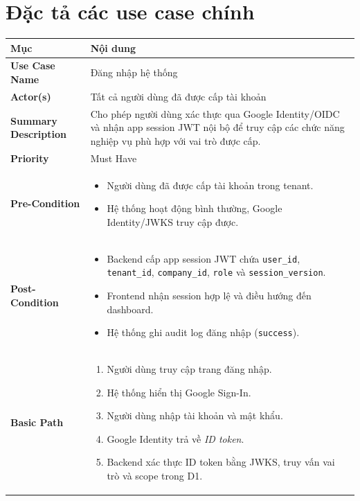 \section{Đặc tả các use case chính}
\label{sec:usecase_spec}

\begin{xltabular}{\textwidth}{|>{\bfseries}p{4.5cm}|X|}
    \hline
    \textbf{Mục} & \textbf{Nội dung} \\
    \hline
    Use Case Name & Đăng nhập hệ thống \\
    \hline
    Actor(s) & Tất cả người dùng đã được cấp tài khoản \\
    \hline
    Summary Description & Cho phép người dùng xác thực qua Google Identity/OIDC và nhận app session JWT nội bộ để truy cập các chức năng nghiệp vụ phù hợp với vai trò được cấp. \\
    \hline
    Priority & Must Have \\
    \hline
    Pre-Condition &
    \begin{itemize}[leftmargin=*, nosep]
        \item Người dùng đã được cấp tài khoản trong tenant.
        \item Hệ thống hoạt động bình thường, Google Identity/JWKS truy cập được.
    \end{itemize} \\
    \hline
    Post-Condition &
    \begin{itemize}[leftmargin=*, nosep]
        \item Backend cấp app session JWT chứa \texttt{user\_id}, \texttt{tenant\_id}, \texttt{company\_id}, \texttt{role} và \texttt{session\_version}.
        \item Frontend nhận session hợp lệ và điều hướng đến dashboard.
        \item Hệ thống ghi audit log đăng nhập (\texttt{success}).
    \end{itemize} \\
    \hline
    Basic Path &
    \begin{enumerate}[leftmargin=*, nosep]
        \item Người dùng truy cập trang đăng nhập.
        \item Hệ thống hiển thị Google Sign-In.
        \item Người dùng nhập tài khoản và mật khẩu.
        \item Google Identity trả về \emph{ID token}.
        \item Backend xác thực ID token bằng JWKS, truy vấn vai trò và scope trong D1.

\end{enumerate}
\end{xltabular}
